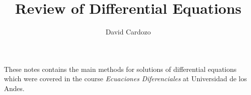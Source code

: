 \documentclass[10pt,a4paper]{article}
\author{David Cardozo}
\title{Review of Differential Equations}
\begin{document}
\maketitle
These notes contains the main methods for solutions of differential equations which were covered in  the course \textit{Ecuaciones Diferenciales} at Universidad de los Andes.




\end{document}
